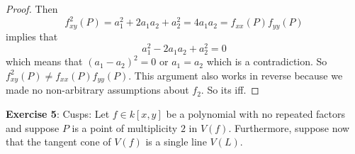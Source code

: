\documentclass{article}
\begin{document}
\begin{proof}
        Then
            \begin{equation*}
                f_{xy}^{2}(P) = a_{1}^{2} + 2a_{1}a_{2} + a_{2}^{2} = 4a_{1}a_{2} = f_{xx}(P)f_{yy}(P)
            \end{equation*}
        implies that
            \begin{equation*}
                a_{1}^{2} - 2a_{1}a_{2} + a_{2}^{2} = 0
            \end{equation*}
        which means that $(a_{1} - a_{2})^{2} = 0$ or $a_{1} = a_{2}$ which is a contradiction. So $f_{xy}^{2}(P) \neq f_{xx}(P)f_{yy}(P)$. This argument also works in reverse because we made no non-arbitrary assumptions about $f_{2}$. So its iff.
    \end{proof}

\textbf{Exercise 5}: Cusps: Let $f \in k[x, y]$ be a polynomial with no repeated factors and suppose $P$ is a point of multiplicity $2$ in $V(f)$. Furthermore, suppose now that the tangent cone of $V(f)$ is a single line $V(L)$.
\end{document}
